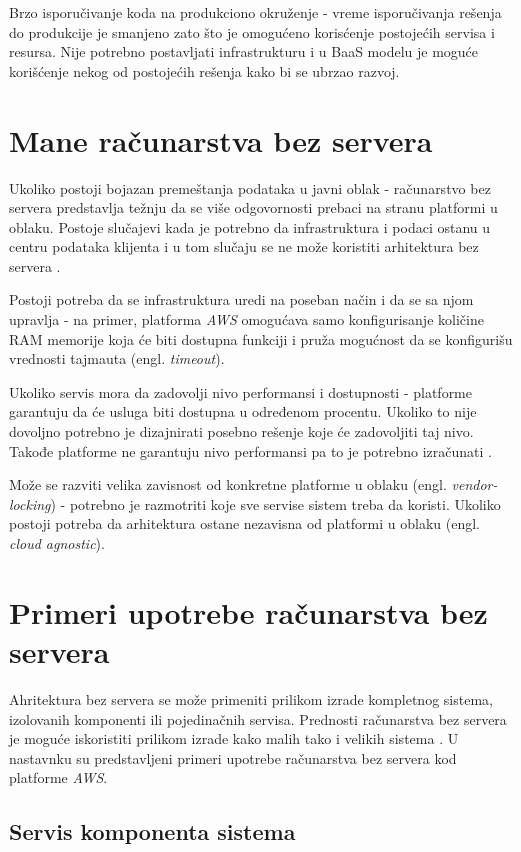 \documentclass[12pt,oneside]{memoir}
\begin{document}
Brzo isporučivanje koda na produkciono okruženje - vreme isporučivanja rešenja do produkcije je smanjeno zato što je omogućeno korisćenje postojećih servisa i resursa. Nije potrebno postavljati infrastrukturu i u BaaS modelu je moguće korišćenje nekog od postojećih rešenja kako bi se ubrzao razvoj.

\section{Mane računarstva bez servera}

Ukoliko postoji bojazan premeštanja podataka u javni oblak - računarstvo bez servera predstavlja težnju da se više odgovornosti prebaci na stranu platformi u oblaku. Postoje slučajevi kada je potrebno da infrastruktura i podaci ostanu u centru podataka klijenta i u tom slučaju se ne može koristiti arhitektura bez servera \cite{sa}.


Postoji potreba da se infrastruktura uredi na poseban način i da se sa njom upravlja - na primer, platforma \emph{AWS} omogućava samo konfigurisanje količine RAM memorije koja će biti dostupna funkciji i pruža mogućnost da se konfigurišu vrednosti tajmauta (engl. \emph{timeout}).

Ukoliko servis mora da zadovolji nivo performansi i dostupnosti - platforme garantuju da će usluga biti dostupna u određenom procentu. Ukoliko to nije dovoljno potrebno je dizajnirati posebno rešenje koje će zadovoljiti taj nivo. Takođe platforme ne garantuju nivo performansi pa to je potrebno izračunati \cite{sa}.

Može se razviti velika zavisnost od konkretne platforme u oblaku (engl. \emph{vendor-locking}) - potrebno je razmotriti koje sve servise sistem treba da koristi. Ukoliko postoji potreba da arhitektura ostane nezavisna od platformi u oblaku (engl. \emph{cloud agnostic}).


\section{Primeri upotrebe računarstva bez servera}

Ahritektura bez servera se može primeniti prilikom izrade kompletnog sistema, izolovanih komponenti ili pojedinačnih servisa. Prednosti računarstva bez servera je moguće iskoristiti prilikom izrade kako malih tako i velikih sistema \cite{sa}. U nastavnku su predstavljeni primeri upotrebe računarstva bez servera kod platforme \emph{AWS}.

\subsection{Servis komponenta sistema}
\end{document}

